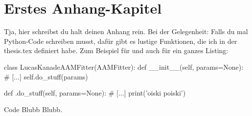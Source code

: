 

\chapter{Erstes Anhang-Kapitel} \label{anhang_1}

Tja, hier schreibst du halt deinen Anhang rein. Bei der Gelegenheit: Falls du mal Python-Code schreiben musst, dafür gibt es lustige Funktionen, die ich in der thesis.tex definiert habe. Zum Beispiel für  und auch für ein ganzes Listing:


\begin{listing}[htp]
\begin{python}
class LucasKanadeAAMFitter(AAMFitter):
    def __init__(self, params=None):
        # [...]
        self.do_stuff(params)

    def .do_stuff(self, params=None):
        # [...]
        print('oiski poiski')
        
\end{python}
\caption[Code]{Code Blubb Blubb.}
\end{listing}




